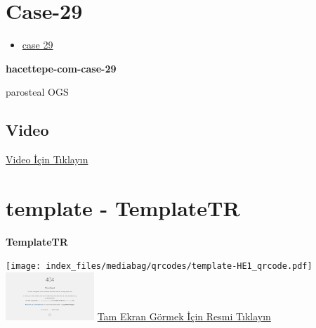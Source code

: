 \documentclass[
  letterpaper,
  DIV=11,
  numbers=noendperiod]{scrreprt}
\providecommand{\tightlist}{%
  \setlength{\itemsep}{0pt}\setlength{\parskip}{0pt}}\usepackage{longtable,booktabs,array}
\begin{document}
\hypertarget{sec-hacettepe-case-of-the-month-case-29}{%
\section{Case-29}\label{sec-hacettepe-case-of-the-month-case-29}}

\begin{itemize}
\tightlist
\item
  \href{https://www.youtube.com/watch?v=GkGz7NV7JmM&ab_channel=KemalKosemehmetoglu}{case
  29}
\end{itemize}

\textbf{hacettepe-com-case-29}

\begin{tcolorbox}[enhanced jigsaw, breakable, opacitybacktitle=0.6, arc=.35mm, colbacktitle=quarto-callout-tip-color!10!white, colback=white, toptitle=1mm, left=2mm, opacityback=0, colframe=quarto-callout-tip-color-frame, titlerule=0mm, rightrule=.15mm, bottomrule=.15mm, toprule=.15mm, bottomtitle=1mm, title=\textcolor{quarto-callout-tip-color}{\faLightbulb}\hspace{0.5em}{Tanı}, coltitle=black, leftrule=.75mm]

parosteal OGS

\end{tcolorbox}

\hypertarget{video-28}{%
\subsection{Video}\label{video-28}}

\href{https://www.youtube.com/watch?v=GkGz7NV7JmM}{Video İçin Tıklayın}

\hypertarget{sec-template}{%
\section{template - TemplateTR}\label{sec-template}}

\textbf{TemplateTR}

\texttt{[image: index\_files/mediabag/qrcodes/template-HE1\_qrcode.pdf]}
\href{https://images.patolojiatlasi.com/template/HE1.html}{\includegraphics[width=0.25\textwidth,height=\textheight]{./screenshots/thumbnail_template-HE1.png}}
\href{https://images.patolojiatlasi.com/template/HE1.html}{Tam Ekran
Görmek İçin Resmi Tıklayın}
\end{document}

